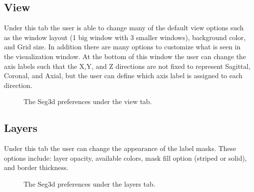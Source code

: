 \documentclass[fleqn,11pt,openany]{book}
\begin{document}
\subsection{View}
Under this tab the user is able to change many of the default view options such as the window layout (1 big window with 3 smaller windows), background color, and Grid size. In addition there are many options to customize what is seen in the visualization window.  At the bottom of this window the user can change the axis labels such that the X,Y, and Z directions
are not fixed to represent Sagittal, Coronal, and Axial, but the user can define which axis label is assigned to each direction.

\begin{figure}[h!]
\caption{The Seg3d preferences under the view tab.}\label{fig:Pref_view}
\end{figure}

\newpage

\subsection{Layers}
Under this tab the user can change the appearance of the label masks. These options include: layer opacity, available colors, mask fill option (striped or solid), and border thickness.

\begin{figure}[h!]
\caption{The Seg3d preferences under the layers tab.}\label{fig:Pref_layers}
\end{figure}
\end{document}
